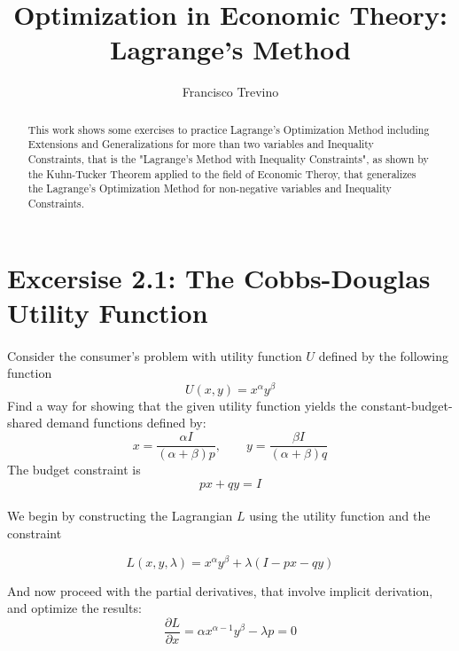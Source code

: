 \documentclass{article}
\author{Francisco Trevino}
\title{Optimization in Economic Theory:\\Lagrange's Method}
\begin{document}
\maketitle

\medskip

\begin{abstract}
This work shows some exercises to practice Lagrange's Optimization Method including Extensions and Generalizations for more than two variables and Inequality Constraints, that is the "Lagrange's Method with Inequality Constraints", as shown by the Kuhn-Tucker Theorem applied to the field of Economic Theroy, that generalizes the Lagrange's Optimization Method for non-negative variables and Inequality Constraints.
\end{abstract}

\bigskip

\section*{Excersise 2.1: The Cobbs-Douglas Utility Function}
\paragraph{}
Consider the consumer's problem with utility function $U$ defined by the following function
  \begin{equation}
    U(x, y) = x^\alpha y^\beta
  \end{equation}
Find a way for showing that the given utility function yields the constant-budget-shared demand functions defined by:
  \begin{equation}\label{df}
    x = \frac{\alpha I}{(\alpha + \beta)p}, \qquad y = \frac{\beta I}{(\alpha + \beta)q}
  \end{equation}
The budget constraint is
  \begin{equation}
    px + qy = I
  \end{equation}

\paragraph{}
We begin by constructing the Lagrangian $L$ using the utility function and the constraint

  \begin{equation}
     L(x, y, \lambda) = x^\alpha y^\beta + \lambda (I - px - qy)
  \end{equation}

And now proceed with the partial derivatives, that involve implicit derivation, and optimize the results:
  \begin{equation}
    \frac{\partial L}{\partial x} = \alpha x^{\alpha - 1} y^\beta - \lambda p = 0
  \end{equation}
\end{document}
